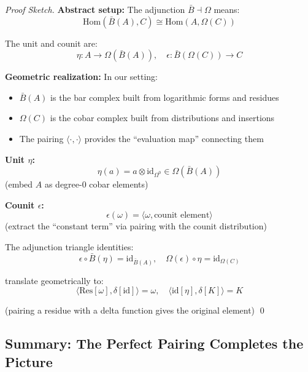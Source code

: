 \begin{proof}[Proof Sketch]
\textbf{Abstract setup:}
The adjunction $\bar{B} \dashv \Omega$ means:
$$\text{Hom}(\bar{B}(A), C) \cong \text{Hom}(A, \Omega(C))$$

The unit and counit are:
$$\eta: A \to \Omega(\bar{B}(A)), \quad \epsilon: \bar{B}(\Omega(C)) \to C$$

\textbf{Geometric realization:}
In our setting:
\begin{itemize}
\item $\bar{B}(A)$ is the bar complex built from logarithmic forms and residues
\item $\Omega(C)$ is the cobar complex built from distributions and insertions
\item The pairing $\langle \cdot, \cdot \rangle$ provides the ``evaluation map'' connecting them
\end{itemize}

\textbf{Unit $\eta$:}
$$\eta(a) = a \otimes \text{id}_{\Omega^0} \in \Omega(\bar{B}(A))$$
(embed $A$ as degree-0 cobar elements)

\textbf{Counit $\epsilon$:}
$$\epsilon(\omega) = \langle \omega, \text{counit element} \rangle$$
(extract the ``constant term'' via pairing with the counit distribution)

The adjunction triangle identities:
$$\epsilon \circ \bar{B}(\eta) = \text{id}_{\bar{B}(A)}, \quad \Omega(\epsilon) \circ \eta = 
\text{id}_{\Omega(C)}$$

translate geometrically to:
$$\langle \text{Res}[\omega], \delta[\text{id}] \rangle = \omega, \quad 
\langle \text{id}[\eta], \delta[K] \rangle = K$$

(pairing a residue with a delta function gives the original element)
\qed
\end{proof}

\subsection{Summary: The Perfect Pairing Completes the Picture}

